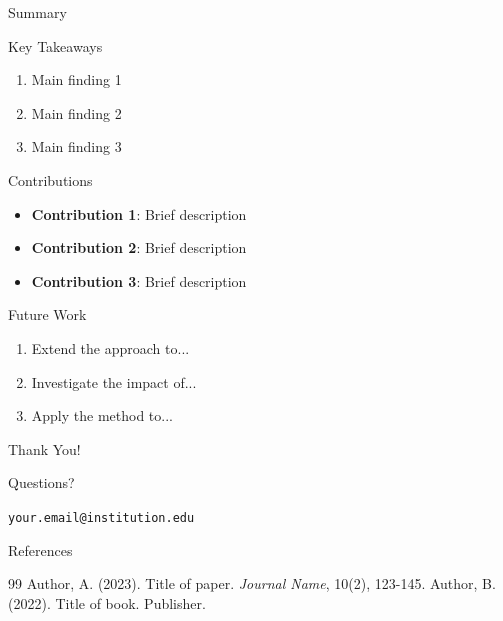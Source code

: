 \documentclass[aspectratio=169]{beamer}
\begin{document}
\begin{frame}{Summary}
\begin{block}{Key Takeaways}
\begin{enumerate}
    \item Main finding 1
    \item Main finding 2
    \item Main finding 3
\end{enumerate}
\end{block}
\end{frame}

\begin{frame}{Contributions}
\begin{itemize}
    \item \textbf{Contribution 1}: Brief description
    \item \textbf{Contribution 2}: Brief description
    \item \textbf{Contribution 3}: Brief description
\end{itemize}
\end{frame}

\begin{frame}{Future Work}
\begin{enumerate}
    \item Extend the approach to...
    \item Investigate the impact of...
    \item Apply the method to...
\end{enumerate}
\end{frame}

\begin{frame}[plain]
\centering
\Huge Thank You!

\vspace{1cm}

\Large Questions?

\vspace{1cm}

\normalsize
\texttt{your.email@institution.edu}
\end{frame}

\begin{frame}[allowframebreaks]{References}
\tiny
\begin{thebibliography}{99}
 Author, A. (2023). Title of paper. \textit{Journal Name}, 10(2), 123-145.
 Author, B. (2022). Title of book. Publisher.
\end{thebibliography}
\end{frame}
\end{document}
